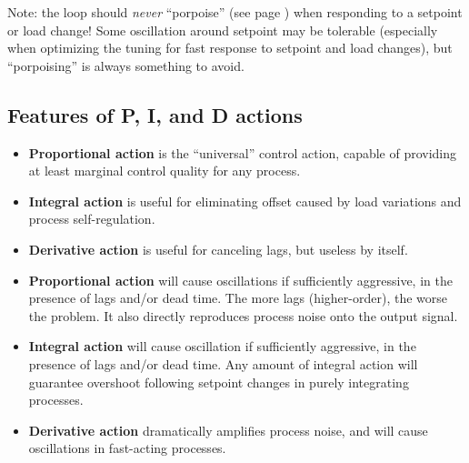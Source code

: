 Note: the loop should \textit{never} ``porpoise'' (see page \pageref{porpoising}) when responding to a setpoint or load change!  Some oscillation around setpoint may be tolerable (especially when optimizing the tuning for fast response to setpoint and load changes), but ``porpoising'' is always something to avoid.










\filbreak
\subsection{Features of P, I, and D actions}

\noindent
{}

\begin{itemize}
\item \textbf{Proportional action} is the ``universal'' control action, capable of providing at least marginal control quality for any process.
\item \textbf{Integral action} is useful for eliminating offset caused by load variations and process self-regulation.
\item \textbf{Derivative action} is useful for canceling lags, but useless by itself.
\end{itemize}

\vskip 10pt

\noindent
{}

\begin{itemize}
\item \textbf{Proportional action} will cause oscillations if sufficiently aggressive, in the presence of lags and/or dead time.  The more lags (higher-order), the worse the problem.  It also directly reproduces process noise onto the output signal.
\item \textbf{Integral action} will cause oscillation if sufficiently aggressive, in the presence of lags and/or dead time.  Any amount of integral action will guarantee overshoot following setpoint changes in purely integrating processes.
\item \textbf{Derivative action} dramatically amplifies process noise, and will cause oscillations in fast-acting processes.
\end{itemize}

\vskip 10pt

\noindent
{}

